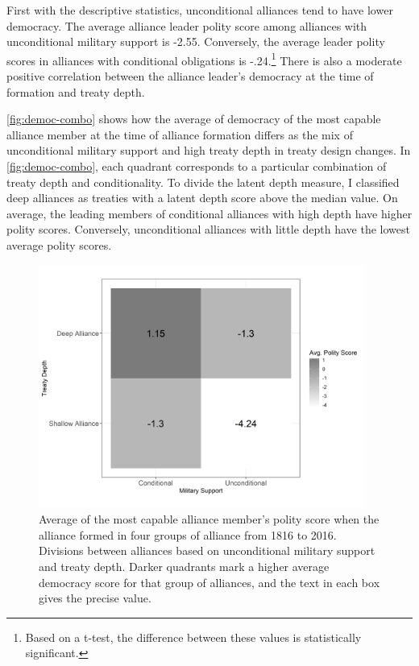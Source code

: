 \documentclass[12pt]{article}
\begin{document}
First with the descriptive statistics, unconditional alliances tend to have lower democracy. 
The average alliance leader polity score among alliances with unconditional military support is -2.55. 
Conversely, the average leader polity scores in alliances with conditional obligations is -.24.\footnote{Based on a t-test, the difference between these values is statistically significant.} 
There is also a moderate positive correlation between the alliance leader's democracy at the time of formation and treaty depth. 


\autoref{fig:democ-combo} shows how the average of democracy of the most capable alliance member at the time of alliance formation differs as the mix of unconditional military support and high treaty depth in treaty design changes.
In \autoref{fig:democ-combo}, each quadrant corresponds to a particular combination of treaty depth and conditionality. 
To divide the latent depth measure, I classified deep alliances as treaties with a latent depth score above the median value. 
On average, the leading members of conditional alliances with high depth have higher polity scores. 
Conversely, unconditional alliances with little depth have the lowest average polity scores. 


\begin{figure}[hbtp]
\centering
\includegraphics[width=0.95\textwidth]{../figures/democ-combo.png}
\caption{Average of the most capable alliance member's polity score when the alliance formed in four groups of alliance from 1816 to 2016. Divisions between alliances based on unconditional military support and treaty depth. Darker quadrants mark a higher average democracy score for that group of alliances, and the text in each box gives the precise value.}
\label{fig:democ-combo}
\end{figure}
\end{document}
